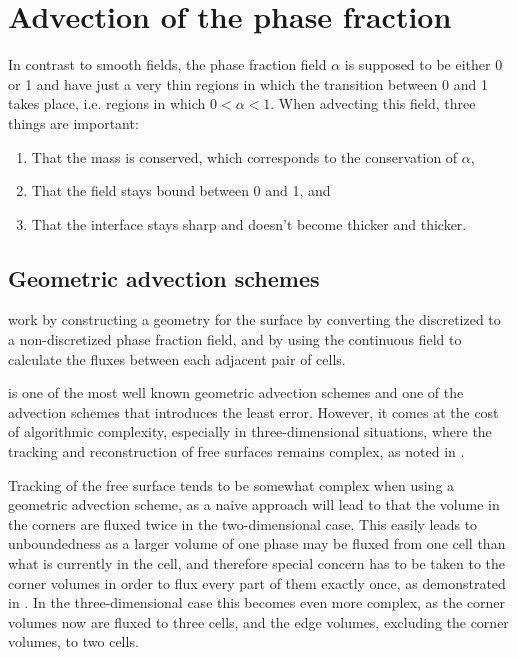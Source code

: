 \section{Advection of the phase fraction}

\label{sec:advection_of_phase_fraction}

In contrast to smooth fields, the phase fraction field $\alpha$ is supposed to be either 0 or 1 and have just a very thin regions in which the transition between 0 and 1 takes place, i.e. regions in which $0 < \alpha < 1$. When advecting this field, three things are important:

\begin{enumerate}
\item That the mass is conserved, which corresponds to the conservation of $\alpha$,
\item That the field stays bound between 0 and 1, and
\item That the interface stays sharp and doesn't become thicker and thicker.
\end{enumerate}

\subsection{Geometric advection schemes}

 work by constructing a geometry for the surface by converting the discretized  to a non-discretized phase fraction field, and by using the continuous field to calculate the fluxes between each adjacent pair of cells.

\PLIC is one of the most well known geometric advection schemes and one of the advection schemes that introduces the least error. However, it comes at the cost of algorithmic complexity, especially in three-dimensional situations, where the tracking and reconstruction of free surfaces remains complex, as noted in \citep{Ingram2009}.

Tracking of the free surface tends to be somewhat complex when using a geometric advection scheme, as a naive approach will lead to that the volume in the corners are fluxed twice in the two-dimensional case. This easily leads to unboundedness as a larger volume of one phase may be fluxed from one cell than what is currently in the cell, and therefore special concern has to be taken to the corner volumes in order to flux every part of them exactly once, as demonstrated in \citep{Rider1998}. In the three-dimensional case this becomes even more complex, as the corner volumes now are fluxed to three cells, and the edge volumes, excluding the corner volumes, to two cells.

